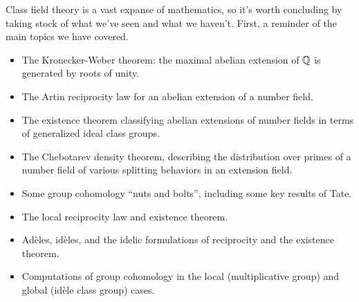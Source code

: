 %
%
%
%
%
%
%

Class field theory is a vast expanse of mathematics, so it's worth
concluding by taking stock of what we've seen and what we haven't.
First, a reminder of the main topics we have covered.
\begin{itemize}
\item
The Kronecker-Weber theorem: the maximal abelian extension of $\mathbb{Q}$
is generated by roots of unity.
\item
The Artin reciprocity law for an abelian extension of a number field.
\item
The existence theorem classifying abelian extensions of number fields
in terms of generalized ideal class groups.
\item
The Chebotarev density theorem, describing the distribution over primes
of a number field of various splitting behaviors in an extension field.
\item
Some group cohomology ``nuts and bolts'', including some key results
of Tate.
\item
The local reciprocity law and existence theorem.
\item
Ad\`eles, id\`eles, and the idelic formulations of reciprocity and the
existence theorem.
\item
Computations of group cohomology in the local (multiplicative group)
and global (id\`ele class group) cases.
\end{itemize}

